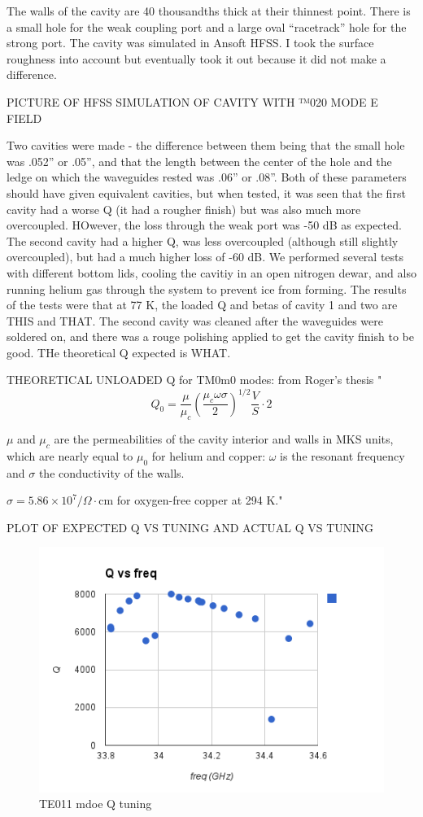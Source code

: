 \documentclass[11pt]{article}
\begin{document}
The walls of the cavity are 40 thousandths thick at their thinnest point. There is a small hole for the weak coupling port and a large oval “racetrack” hole for the strong port.  The cavity was simulated in Ansoft HFSS. I took the surface roughness into account but eventually took it out because it did not make a difference. 

PICTURE OF HFSS SIMULATION OF CAVITY WITH ™020 MODE E FIELD

Two cavities were made - the difference between them being that the small hole was .052” or .05”, and that the length between the center of the hole and the ledge on which the waveguides rested was .06” or .08”. Both of these parameters should have given equivalent cavities, but when tested, it was seen that the first cavity had a worse Q (it had a rougher finish) but was also much more overcoupled. HOwever, the loss through the weak port was -50 dB as expected. The second cavity had a higher Q, was less overcoupled (although still slightly overcoupled), but had a much higher loss of -60 dB. We performed several tests with different bottom lids, cooling the cavitiy in an open nitrogen dewar, and also running helium gas through the system to prevent ice from forming. The results of the tests were that at 77 K, the loaded Q and betas of cavity 1 and two are THIS and THAT. The second cavity was cleaned after the waveguides were soldered on, and there was a rouge polishing applied to get the cavity finish to be good. THe theoretical Q expected is WHAT.

THEORETICAL UNLOADED Q for TM0m0 modes: from Roger's thesis
"
$$Q_0 = \frac{\mu}{\mu_c} (\frac{\mu_c \omega \sigma}{2})^{1/2} \frac{V}{S} \cdot 2 $$

$\mu$ and $\mu_c$ are the permeabilities of the cavity interior and walls in MKS units, which are nearly equal to $\mu_0$ for helium and copper: $\omega$ is the resonant frequency and $\sigma$ the conductivity of the walls.

$\sigma = 5.86 \times 10^{7}/\Omega\cdot\text{cm}$ for oxygen-free copper at 294 K."

PLOT OF EXPECTED Q VS TUNING AND ACTUAL Q VS TUNING
\begin{figure}
\includegraphics[scale=0.7]{Q_vs_freq}
\caption{TE011 mdoe Q tuning}
\end{figure}
\end{document}
